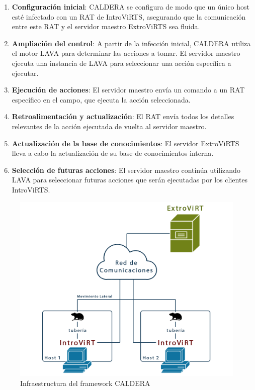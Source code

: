 \begin{enumerate}
    \item \textbf{Configuración inicial}: \gls{CALDERA} se configura de modo que un único host esté infectado con un \gls{RAT} de IntroViRTS, asegurando que la comunicación entre este \gls{RAT} y el servidor maestro ExtroViRTS sea fluida. 
    \item \textbf{Ampliación del control}: A partir de la infección inicial, \gls{CALDERA} utiliza el motor \gls{LAVA} para determinar las acciones a tomar. El servidor maestro ejecuta una instancia de LAVA para seleccionar una acción específica a ejecutar.
    \item \textbf{Ejecución de acciones}: El servidor maestro envía un comando a un \gls{RAT} específico en el campo, que ejecuta la acción seleccionada.
    \item \textbf{Retroalimentación y actualización}: El \gls{RAT} envía todos los detalles relevantes de la acción ejecutada de vuelta al servidor maestro.
    \item \textbf{Actualización de la base de conocimientos}: El servidor ExtroViRTS lleva a cabo la actualización de su base de conocimientos interna.
    \item \textbf{Selección de futuras acciones}: El servidor maestro continúa utilizando \gls{LAVA} para seleccionar futuras acciones que serán ejecutadas por los clientes IntroViRTS.
\end{enumerate}

\vspace{-3mm}

\begin{figure}[H]
    \centering
    \includegraphics[width=0.75\linewidth]{imagenes/CALDERA-infraestructura.png}
    \caption{Infraestructura del framework \gls{CALDERA} \cite{gjerstad2022generating}}
    \label{fig:caldera-infraestructure}
\end{figure}

